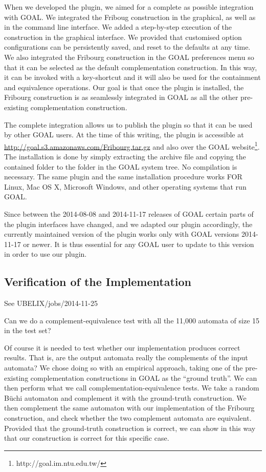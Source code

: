 When we developed the plugin, we aimed for a complete as possible integration with GOAL. We integrated the Friboug construction in the graphical, as well as in the command line interface. We added a step-by-step execution of the construction in the graphical interface. We provided that customised option configurations can be persistently saved, and reset to the defaults at any time. We also integrated the Fribourg construction in the GOAL preferences menu so that it can be selected as the default complementation construction. In this way, it can be invoked with a key-shortcut and it will also be used for the containment and equivalence operations. Our goal is that once the plugin is installed, the Fribourg construction is as seamlessly integrated in GOAL as all the other pre-existing complementation construction.

The complete integration allows us to publish the plugin so that it can be used by other GOAL users. At the time of this writing, the plugin is accessible at \url{http://goal.s3.amazonaws.com/Fribourg.tar.gz} and also over the GOAL website\footnote{http://goal.im.ntu.edu.tw/}. The installation is done by simply extracting the archive file and copying the contained folder to the  folder in the GOAL system tree. No compilation is necessary. The same plugin and the same installation procedure works FOR Linux, Mac OS X, Microsoft Windows, and other operating systems that run GOAL.

Since between the 2014-08-08 and 2014-11-17 releases of GOAL certain parts of the plugin interfaces have changed, and we adapted our plugin accordingly, the currently maintained version of the plugin works only with GOAL versions 2014-11-17 or newer. It is thus essential for any GOAL user to update to this version in order to use our plugin.

\subsection{Verification of the Implementation}

See UBELIX/jobs/2014-11-25

Can we do a complement-equivalence test with all the 11,000 automata of size 15 in the test set?

Of course it is needed to test whether our implementation produces correct results. That is, are the output automata really the complements of the input automata? We chose doing so with an empirical approach, taking one of the pre-existing complementation constructions in GOAL as the ``ground truth''. We can then perform what we call complementation-equivalence tests. We take a random Büchi automaton and complement it with the ground-truth construction. We then complement the same automaton with our implementation of the Fribourg construction, and check whether the two complement automata are equivalent. Provided that the ground-truth construction is correct, we can show in this way that our construction is correct for this specific case.

